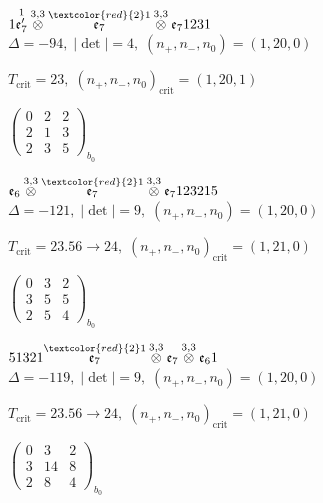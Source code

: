 \documentclass[10pt]{article}
\begin{document}
\smallskip

$1\overset{1}{\mathfrak{e}_7'}\overset{3,3}{\otimes}\overset{\textcolor{red}{2}1}{\mathfrak{e}_7}\overset{3,3}{\otimes}\mathfrak{e}_71231$ \quad $\Delta=-94,\; |\det|=4,\; (n_+,n_-,n_0)=(1,20,0)$

\hspace{1em}$T_{\text{crit}}=23,\; (n_+,n_-,n_0)_{\text{crit}}=(1,20,1)$

\hspace{2em}$\left(\begin{smallmatrix}0 & 2 & 2 \\ 2 & 1 & 3 \\ 2 & 3 & 5\end{smallmatrix}\right)_{\!b_0}$

\smallskip

$\mathfrak{e}_6\overset{3,3}{\otimes}\overset{\textcolor{red}{2}1}{\mathfrak{e}_7}\overset{3,3}{\otimes}\mathfrak{e}_7123215$ \quad $\Delta=-121,\; |\det|=9,\; (n_+,n_-,n_0)=(1,20,0)$

\hspace{1em}$T_{\text{crit}}=23.56 \to 24,\; (n_+,n_-,n_0)_{\text{crit}}=(1,21,0)$

\hspace{2em}$\left(\begin{smallmatrix}0 & 3 & 2 \\ 3 & 5 & 5 \\ 2 & 5 & 4\end{smallmatrix}\right)_{\!b_0}$

\smallskip

$51321\overset{\textcolor{red}{2}1}{\mathfrak{e}_7}\overset{3,3}{\otimes}\mathfrak{e}_7\overset{3,3}{\otimes}\mathfrak{e}_61$ \quad $\Delta=-119,\; |\det|=9,\; (n_+,n_-,n_0)=(1,20,0)$

\hspace{1em}$T_{\text{crit}}=23.56 \to 24,\; (n_+,n_-,n_0)_{\text{crit}}=(1,21,0)$

\hspace{2em}$\left(\begin{smallmatrix}0 & 3 & 2 \\ 3 & 14 & 8 \\ 2 & 8 & 4\end{smallmatrix}\right)_{\!b_0}$
\end{document}
